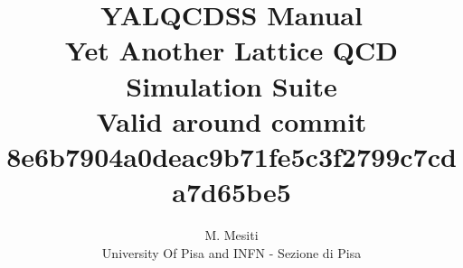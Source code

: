 \documentclass[a4paper,10pt]{book}
\title{{\Huge \bf YALQCDSS Manual} \\
Yet Another Lattice QCD Simulation Suite \\
{\small Valid around commit 
8e6b7904a0deac9b71fe5c3f2799c7cda7d65be5}}
\author{M. Mesiti\\{\small University Of Pisa and INFN - Sezione di Pisa}}
\begin{document}
\maketitle
\date{}
 

  

  
  
  
%  
\end{document}
